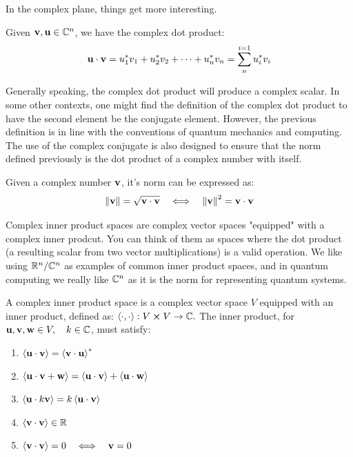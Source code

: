 \documentclass[12pt]{article}
\begin{document}
In the complex plane, things get more interesting. 

\begin{definition}
    Given $\mathbf{v}, \mathbf{u} \in \mathbb{C}^n$, we have the complex dot product:
    $$\mathbf{u} \cdot \mathbf{v} = u_1^* v_1 + u_2^* v_2 + \cdots + u_n^* v_n = \sum_{n}^{i=1}u_i^* v_i$$
\end{definition}

Generally speaking, the complex dot product will produce a complex scalar. In some other contexts, one might find the definition of the complex dot product to have the second element be the conjugate element. However, the previous definition is in line with the conventions of quantum mechanics and computing. The use of the complex conjugate is also designed to ensure that the norm defined previously is the dot product of a complex number with itself. 

\begin{theorem}
    Given a complex number $\mathbf{v}$, it's norm can be expressed as:
    $$\norm{\mathbf{v}} = \sqrt{\mathbf{v} \cdot \mathbf{v}} \quad \Longleftrightarrow \quad \norm{\mathbf{v}}^2 = \mathbf{v} \cdot \mathbf{v}$$
\end{theorem}

Complex inner product spaces are complex vector spaces "equipped" with a complex inner prodcut. You can think of them as spaces where the dot product (a resulting scalar from two vector multiplications) is a valid operation. We like using $\mathbb{R}^n/\mathbb{C}^n$ as examples of common inner product spaces, and in quantum computing we really like $\mathbb{C}^n$ as it is the norm for representing quantum systems. 

\begin{definition}
    A complex inner product space is a complex vector space $V$ equipped with an inner product, defined as: $\left\langle \cdot, \cdot \right\rangle: V \cross V \rightarrow \mathbb{C}. $ The inner product, for $\mathbf{u}, \mathbf{v}, \mathbf{w} \in V, \quad k \in \mathbb{C}$, must satisfy:
    \begin{enumerate}
        \item $\left\langle\mathbf{u} \cdot \mathbf{v} \right\rangle = {\left\langle\mathbf{v} \cdot \mathbf{u} \right\rangle}^*$
        \item $\left\langle\mathbf{u} \cdot \mathbf{v} + \mathbf{w} \right\rangle = \left\langle\mathbf{u} \cdot \mathbf{v} \right\rangle + \left\langle\mathbf{u} \cdot \mathbf{w} \right\rangle$
        \item $\left\langle\mathbf{u} \cdot k \mathbf{v} \right\rangle = k \left\langle\mathbf{u} \cdot \mathbf{v} \right\rangle$
        \item $\left\langle\mathbf{v} \cdot \mathbf{v} \right\rangle \in \mathbb{R}$
        \item $\left\langle\mathbf{v} \cdot \mathbf{v} \right\rangle = 0 \quad \Longleftrightarrow \quad \mathbf{v} = 0$
    \end{enumerate}
\end{definition}
\end{document}
